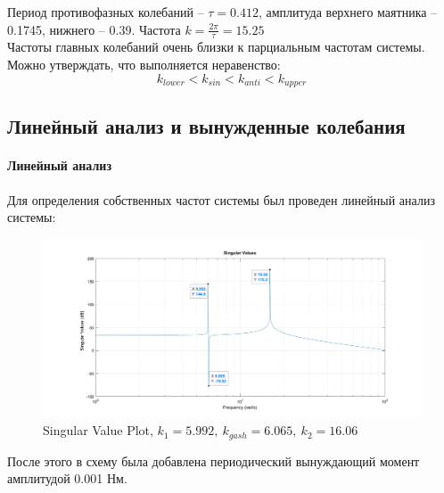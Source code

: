 \documentclass{article}
\begin{document}
	Период противофазных колебаний -- $\tau = 0.412$, амплитуда верхнего маятника -- 0.1745, нижнего -- 0.39. Частота $k = \frac{2\pi}{\tau} = 15.25$\\
	Частоты главных колебаний очень близки к парциальным частотам системы. Можно утверждать, что выполняется неравенство:
	$$k_{lower} < k_{sin} < k_{anti} < k_{upper}$$
	\subsection*{Линейный анализ и вынужденные колебания}
	\paragraph*{Линейный анализ\\}
	Для определения собственных частот системы был проведен линейный анализ системы:
	\begin{figure}[H]
		\centering
		\includegraphics[width=1.2\linewidth]{SVplot}
		\caption{Singular Value Plot, $k_1 = 5.992,\ k_{gash} = 6.065,\ k_2 = 16.06$}
		\label{fig:svplot}
	\end{figure}
	После этого в схему была добавлена периодический вынуждающий момент амплитудой 0.001 Нм.
\end{document}
